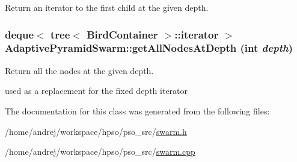 Return an iterator to the first child at the given depth. 

\hypertarget{classAdaptivePyramidSwarm_9df13e57e0d7b380ae689a5bc7ae7c7f}{
\subsubsection{\setlength{\rightskip}{0pt plus 5cm}deque$<$ {\bf tree}$<$ {\bf BirdContainer} $>$::iterator $>$ AdaptivePyramidSwarm::getAllNodesAtDepth (int {\em depth})}}
\label{classAdaptivePyramidSwarm_9df13e57e0d7b380ae689a5bc7ae7c7f}


Return all the nodes at the given depth. 

used as a replacement for the fixed depth iterator 

The documentation for this class was generated from the following files:\begin{CompactItemize}
\item 
/home/andrej/workspace/hpso/pso\_\-src/\hyperlink{swarm_8h}{swarm.h}\item 
/home/andrej/workspace/hpso/pso\_\-src/\hyperlink{swarm_8cpp}{swarm.cpp}\end{CompactItemize}
